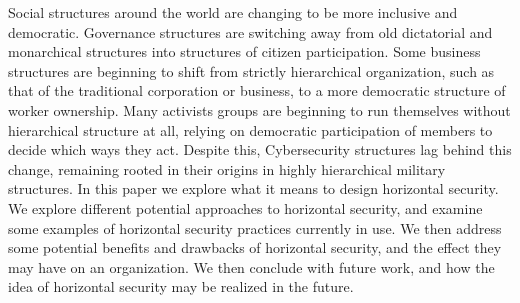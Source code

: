 Social structures around the world are changing to be more inclusive and
democratic. Governance structures are switching away from old dictatorial and
monarchical structures into structures of citizen participation. Some business
structures are beginning to shift from strictly hierarchical organization, such
as that of the traditional corporation or business, to a more democratic
structure of worker ownership. Many activists groups are beginning to run
themselves without hierarchical structure at all, relying on democratic
participation of members to decide which ways they act. Despite this,
Cybersecurity structures lag behind this change, remaining rooted in their
origins in highly hierarchical military structures. In this paper we explore
what it means to design horizontal security. We explore different potential
approaches to horizontal security, and examine some examples of horizontal
security practices currently in use. We then address some potential benefits and
drawbacks of horizontal security, and the effect they may have on an
organization. We then conclude with future work, and how the idea of horizontal
security may be realized in the future.

